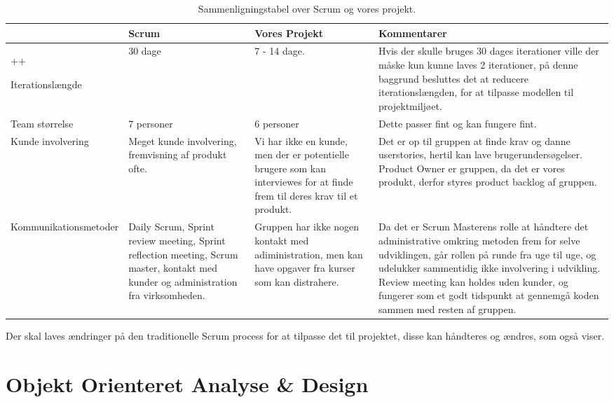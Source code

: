 \begin{sidewaystable}
      \begin{tabular}{p{5cm}p{5cm}p{5cm}p{5cm}}
	       				 & Scrum  & Vores Projekt & Kommentarer  \\ \hline++

	   Iterationslængde  		
	   		& 30 dage 
	   		& 7 - 14 dage. 
	   		& Hvis der skulle bruges 30 dages iterationer ville der måske kun kunne laves 2 iterationer, på denne baggrund besluttes det at reducere iterationslængden, for at tilpasse modellen til projektmiljøet.\\
	   		
	   Team størrelse    		
	   		& 7 personer
	   		& 6 personer 
	   		& Dette passer fint og kan fungere fint. \\
	   		
	   Kunde involvering 		
	   		& Meget kunde involvering, fremvisning af produkt ofte.
	   		& Vi har ikke en kunde, men der er potentielle brugere som kan interviewes for at finde frem til deres krav til et produkt.
	   		& Det er op til gruppen at finde krav og danne userstories, hertil kan lave brugerundersøgelser. Product Owner er gruppen, da det er vores produkt, derfor styres product backlog af gruppen.\\
	   		
	   Kommunikationsmetoder	
	   		& Daily Scrum, Sprint review meeting, Sprint reflection meeting, Scrum master, kontakt med kunder og administration fra virksomheden.
	   		& Gruppen har ikke nogen kontakt med adiministration, men kan have opgaver fra kurser som kan distrahere. 
	   		& Da det er Scrum Masterens rolle at håndtere det administrative omkring metoden frem for selve udviklingen, går rollen på runde fra uge til uge, og udelukker sammentidig ikke involvering i udvikling. Review meeting kan holdes uden kunder, og fungerer som et godt tidspunkt at gennemgå koden sammen med resten af gruppen. \\
    \end{tabular}
  \caption{Sammenligningstabel over Scrum og vores projekt.}\label{tabel:sammenligningstabel}
\end{sidewaystable}

Der skal laves ændringer på den traditionelle Scrum process  for at tilpasse det til projektet, disse kan håndteres og ændres, som  også viser.

\section{Objekt Orienteret Analyse \& Design}

